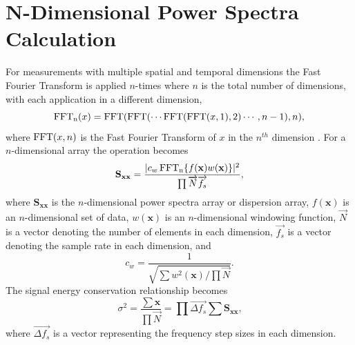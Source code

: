 \section{N-Dimensional Power Spectra Calculation}
For measurements with multiple spatial and temporal dimensions the Fast Fourier Transform is applied $n$-times where $n$ is the total number of dimensions, with each application in a different dimension,
\begin{equation}
 \operatorname{FFT_n}(x) = \operatorname{FFT}(\operatorname{FFT}(\cdots\operatorname{FFT}(\operatorname{FFT}(x,1),2)\cdots,n-1),n) \textrm{,}
 \label{eqn:04_fftn}
\end{equation}
where $\operatorname{FFT}(x,n)$ is the Fast Fourier Transform of $x$ in the $n^{th}$ dimension \cite{An-1991-QKg7heKm}.
For a $n$-dimensional array the operation becomes \cite{McClellan-1982-rGQzuZ7t}
\begin{equation}
 \mathbf{S_{xx}} =\frac{|c_w\operatorname{FFT_n}\{f(\mathbf{x}) w(\mathbf{x})\}|^2}{\prod{\overrightarrow{N}\overrightarrow{f_s}}} \textrm{,}
 \label{eqn:04_sxxn}
\end{equation}
where $\mathbf{S_{xx}}$ is the $n$-dimensional power spectra array or dispersion array, $f(\mathbf{x})$ is an $n$-dimensional set of data, $w(\mathbf{x})$ is an $n$-dimensional windowing function, $\overrightarrow{N}$ is a vector denoting the number of elements in each dimension, $\overrightarrow{f_s}$ is a vector denoting the sample rate in each dimension, and
\begin{equation}
 c_w = \frac{1}{\sqrt{\sum w^2(\mathbf{x})/\prod{\overrightarrow{N}}}} \textrm{.}
 \label{eqn:04_windown}
\end{equation}
The signal energy conservation relationship becomes
\begin{equation}
  \sigma^2=\frac{\sum\mathbf{x}}{\prod{\overrightarrow{N}}} = \prod{\overrightarrow{\Delta f_s}}\sum\mathbf{S_{xx}} \textrm{,}
  \label{eqn:04_fftn_energy_conservation}
\end{equation}
where $\overrightarrow{\Delta f_s}$ is a vector representing the frequency step sizes in each dimension.

